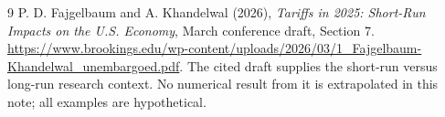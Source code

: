 \documentclass[11pt]{article}
\theoremstyle{definition}
\begin{document}
\begin{thebibliography}{9}
 P. D. Fajgelbaum and A. Khandelwal (2026),
\emph{Tariffs in 2025: Short-Run Impacts on the U.S. Economy}, March conference
draft, Section 7.
\url{https://www.brookings.edu/wp-content/uploads/2026/03/1_Fajgelbaum-Khandelwal_unembargoed.pdf}.
The cited draft supplies the short-run versus long-run research context. No
numerical result from it is extrapolated in this note; all examples are hypothetical.
\end{thebibliography}
\end{document}

